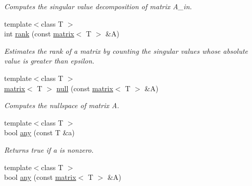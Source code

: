 \begin{DoxyCompactItemize}
\begin{DoxyCompactList}\small\item\em Computes the singular value decomposition of matrix A\-\_\-in. \end{DoxyCompactList}\item 
\hypertarget{namespacekeycpp_aeb9efbc77cc58fa22403ea7ae5f4555c}{{\footnotesize template$<$class T $>$ }\\int \hyperlink{namespacekeycpp_aeb9efbc77cc58fa22403ea7ae5f4555c}{rank} (const \hyperlink{classkeycpp_1_1matrix}{matrix}$<$ T $>$ \&A)}\label{namespacekeycpp_aeb9efbc77cc58fa22403ea7ae5f4555c}

\begin{DoxyCompactList}\small\item\em Estimates the rank of a matrix by counting the singular values whose absolute value is greater than epsilon. \end{DoxyCompactList}\item 
\hypertarget{namespacekeycpp_a8f497e2da901adba0e1257be943595a1}{{\footnotesize template$<$class T $>$ }\\\hyperlink{classkeycpp_1_1matrix}{matrix}$<$ T $>$ \hyperlink{namespacekeycpp_a8f497e2da901adba0e1257be943595a1}{null} (const \hyperlink{classkeycpp_1_1matrix}{matrix}$<$ T $>$ \&A)}\label{namespacekeycpp_a8f497e2da901adba0e1257be943595a1}

\begin{DoxyCompactList}\small\item\em Computes the nullspace of matrix A. \end{DoxyCompactList}\item 
\hypertarget{namespacekeycpp_a70b89ab3e8f66f86c47c3bde004d4487}{{\footnotesize template$<$class T $>$ }\\bool \hyperlink{namespacekeycpp_a70b89ab3e8f66f86c47c3bde004d4487}{any} (const T \&a)}\label{namespacekeycpp_a70b89ab3e8f66f86c47c3bde004d4487}

\begin{DoxyCompactList}\small\item\em Returns true if a is nonzero. \end{DoxyCompactList}\item 
\hypertarget{namespacekeycpp_ade6d308fd22d34ad4860e5fcd22ccb39}{{\footnotesize template$<$class T $>$ }\\bool \hyperlink{namespacekeycpp_ade6d308fd22d34ad4860e5fcd22ccb39}{any} (const \hyperlink{classkeycpp_1_1matrix}{matrix}$<$ T $>$ \&A)}\label{namespacekeycpp_ade6d308fd22d34ad4860e5fcd22ccb39}


\end{DoxyCompactItemize}
